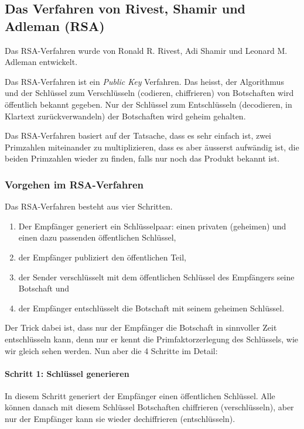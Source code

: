 
\subsection{Das Verfahren von Rivest, Shamir und Adleman (RSA)}
\label{subsec:rsa}

Das RSA-Verfahren wurde von Ronald R. Rivest, Adi Shamir und Leonard M.
Adleman entwickelt.

Das RSA-Verfahren ist ein \emph{Public Key} Verfahren. Das heisst, der Algorithmus
und der Schlüssel zum Verschlüsseln (codieren, chiffrieren) von Botschaften wird
öffentlich bekannt gegeben. Nur der Schlüssel zum Entschlüsseln (decodieren,
in Klartext zurückverwandeln) der Botschaften wird geheim gehalten.

Das RSA-Verfahren basiert auf der Tatsache, dass es sehr einfach ist, zwei
Primzahlen miteinander zu multiplizieren, dass es aber äusserst aufwändig ist,
die beiden Primzahlen wieder zu finden, falls nur noch das Produkt bekannt ist.

\subsubsection*{Vorgehen im RSA-Verfahren}

Das RSA-Verfahren besteht aus vier Schritten.

\begin{enumerate}
    \item Der Empfänger generiert ein Schlüsselpaar: einen privaten (geheimen)
    und einen dazu passenden öffentlichen Schlüssel,
    \item der Empfänger publiziert den öffentlichen Teil,
    \item der Sender verschlüsselt mit dem öffentlichen Schlüssel des Empfängers
    seine Botschaft und
    \item der Empfänger entschlüsselt die Botschaft mit seinem geheimen Schlüssel.
\end{enumerate}

Der Trick dabei ist, dass nur der Empfänger die Botschaft in sinnvoller Zeit
entschlüsseln kann, denn nur er kennt die Primfaktorzerlegung des Schlüssels,
wie wir gleich sehen werden. Nun aber die 4 Schritte im Detail:

\paragraph*{Schritt 1: Schlüssel generieren}
In diesem Schritt generiert der Empfänger einen öffentlichen Schlüssel.
Alle können danach mit diesem Schlüssel Botschaften chiffrieren (verschlüsseln),
aber nur der Empfänger kann sie wieder dechiffrieren (entschlüsseln).

